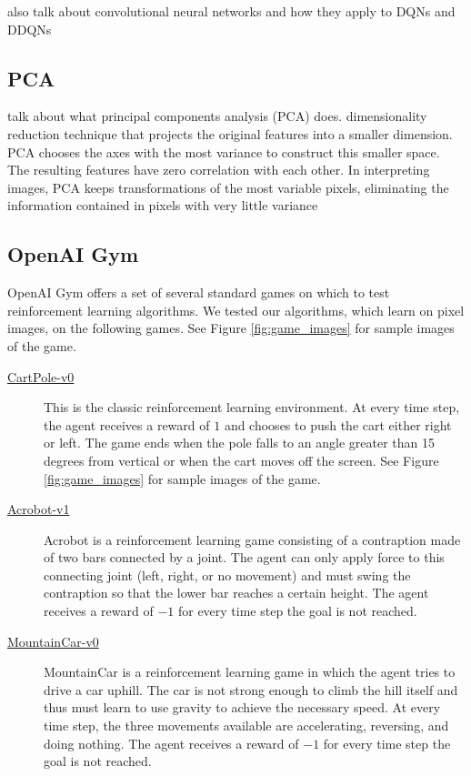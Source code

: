 \documentclass[11pt, twocolumn]{article}
\begin{document}
also talk about convolutional neural networks and how they apply to
DQNs and DDQNs

\subsection{PCA}

talk about what principal components analysis (PCA)
does. dimensionality reduction technique that projects the original
features into a smaller dimension. PCA chooses the axes with the most
variance to construct this smaller space. The resulting features have
zero correlation with each other. In interpreting images, PCA keeps
transformations of the most variable pixels, eliminating the
information contained in pixels with very little variance

\subsection{OpenAI Gym}

OpenAI Gym \cite{brockman2016openai} offers a set of several standard
games on which to test reinforcement learning algorithms. We tested
our algorithms, which learn on pixel images, on the following
games. See Figure \ref{fig:game_images} for sample images of the game.

\begin{description}
\item[\href{https://gym.openai.com/envs/CartPole-v0/}{CartPole-v0}]
This is the classic reinforcement learning environment. At every time
step, the agent receives a reward of $1$ and chooses to push the cart
either right or left. The game ends when the pole falls to an angle
greater than 15 degrees from vertical or when the cart moves off the
screen. See Figure \ref{fig:game_images} for sample images of the
game.
\item[\href{https://gym.openai.com/envs/Acrobot-v1/}{Acrobot-v1}]
Acrobot is a reinforcement learning game consisting of a contraption
made of two bars connected by a joint. The agent can only apply force
to this connecting joint (left, right, or no movement) and must swing
the contraption so that the lower bar reaches a certain height. The
agent receives a reward of $-1$ for every time step the goal is not
reached.
\item[\href{https://gym.openai.com/envs/MountainCar-v0/}{MountainCar-v0}]
MountainCar is a reinforcement learning game in which the agent tries
to drive a car uphill. The car is not strong enough to climb the hill
itself and thus must learn to use gravity to achieve the necessary
speed. At every time step, the three movements available are
accelerating, reversing, and doing nothing. The agent receives a
reward of $-1$ for every time step the goal is not reached.
\end{description}
\end{document}
